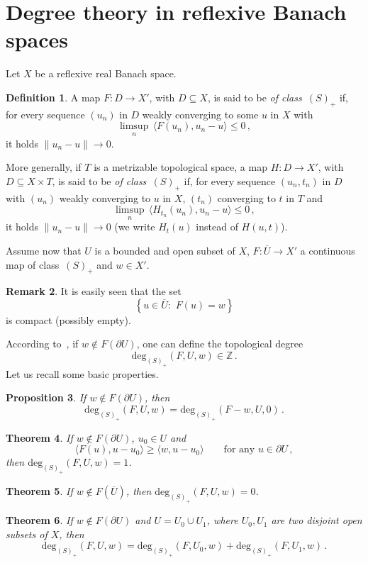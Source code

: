 \documentclass[twoside,reqno]{amsart}
\numberwithin{equation}{section}
\newtheorem{thm}{Theorem}[section]
\newtheorem{prop}[thm]{Proposition}
\theoremstyle{definition}
\newtheorem{defn}[thm]{Definition}
\newtheorem{rem}[thm]{Remark}
\newcommand{\Z}{\mathbb{Z}}
\newcommand{\cl}[1]{\overline{#1}}
\begin{document}
\section{Degree theory in reflexive Banach spaces}
\label{sect:degreeb}
%
Let $X$ be a reflexive real Banach space.
%
\begin{defn}
\label{defn:S+}
A map $F:D\rightarrow X'$, with $D\subseteq X$, is said
to be \emph{of class~$(S)_+$} if, for every sequence $(u_n)$
in $D$ weakly converging to some $u$ in $X$ with
\[
\limsup_n \, \langle F(u_n),u_n-u\rangle \leq 0\,,
\]
it holds $\|u_n-u\|\to 0$.
\par
More generally, if $T$ is a metrizable topological space,
a map $H:D\rightarrow X'$, with $D\subseteq X\times T$, is said
to be \emph{of class~$(S)_+$} if, for every sequence
$(u_n,t_n)$ in $D$ with
$(u_n)$ weakly converging to $u$ in $X$,
$(t_n)$ converging to $t$ in $T$ and
\[
\limsup_n \, \langle H_{t_n}(u_n),u_n-u\rangle \leq 0\,,
\]
it holds $\|u_n-u\|\to 0$ (we write $H_t(u)$
instead of $H(u,t)$).
\end{defn}
%
Assume now that $U$ is a bounded and open subset 
of $X$, $F:\cl{U}\rightarrow X'$ a 
continuous map of class~$(S)_+$ and $w\in X'$.
%
\begin{rem}
It is easily seen that the set
\[
\left\{u\in\cl{U}:\,\,F(u)=w\right\}
\]
is compact (possibly empty).
\end{rem}
%
According
to~\cite{browder1983, oregan_cho_chen2006, skrypnik1994},
if $w\not\in F(\partial U)$, one can define
the topological degree
\[
\mathrm{deg}_{(S)_+}(F,U,w)\in\Z\,.
\]
Let us recall some basic properties.
%
\begin{prop}
If $w\not\in F(\partial U)$, then
\[
\mathrm{deg}_{(S)_+}(F,U,w) = \mathrm{deg}_{(S)_+}(F-w,U,0)\,.
\]
\end{prop}
%
\begin{thm}
\label{thm:normalizationw}
If $w\not\in F(\partial U)$, $u_0\in U$ and
\[
\langle F(u),u-u_0\rangle \geq \langle w,u-u_0\rangle
\qquad\text{for any $u\in \partial{U}$}\,,
\]
then $\mathrm{deg}_{(S)_+}(F,U,w) = 1$.
\end{thm}
%
\begin{thm}
If $w\not\in F(\cl{U})$, then
$\mathrm{deg}_{(S)_+}(F,U,w) = 0$.
\end{thm}
%
\begin{thm}
If $w\not\in F(\partial U)$
and $U=U_0\cup U_1$, where $U_0, U_1$ are two disjoint open
subsets of $X$, then
\[
\mathrm{deg}_{(S)_+}(F,U,w) =
\mathrm{deg}_{(S)_+}(F,U_0,w) + 
\mathrm{deg}_{(S)_+}(F,U_1,w) \,.
\]
\end{thm}
\end{document}
